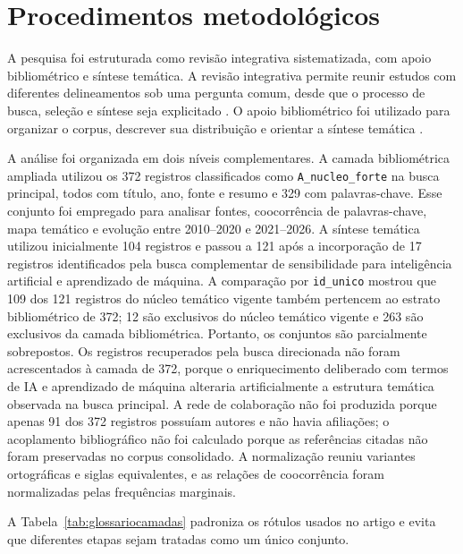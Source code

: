\section{Procedimentos metodológicos}
\label{sec:metodologia}

A pesquisa foi estruturada como revisão integrativa sistematizada, com apoio bibliométrico e síntese temática. A revisão integrativa permite reunir estudos com diferentes delineamentos sob uma pergunta comum, desde que o processo de busca, seleção e síntese seja explicitado \parencite{whittemore_revisaointegrativa_2005,snyder_revisaometodologia_2019}. O apoio bibliométrico foi utilizado para organizar o corpus, descrever sua distribuição e orientar a síntese temática \parencite{donthu_bibliometria_2021}.

A análise foi organizada em dois níveis complementares. A camada bibliométrica ampliada utilizou os 372 registros classificados como \texttt{A\_nucleo\_forte} na busca principal, todos com título, ano, fonte e resumo e 329 com palavras-chave. Esse conjunto foi empregado para analisar fontes, coocorrência de palavras-chave, mapa temático e evolução entre 2010--2020 e 2021--2026. A síntese temática utilizou inicialmente 104 registros e passou a 121 após a incorporação de 17 registros identificados pela busca complementar de sensibilidade para inteligência artificial e aprendizado de máquina. A comparação por \texttt{id\_unico} mostrou que 109 dos 121 registros do núcleo temático vigente também pertencem ao estrato bibliométrico de 372; 12 são exclusivos do núcleo temático vigente e 263 são exclusivos da camada bibliométrica. Portanto, os conjuntos são parcialmente sobrepostos. Os registros recuperados pela busca direcionada não foram acrescentados à camada de 372, porque o enriquecimento deliberado com termos de IA e aprendizado de máquina alteraria artificialmente a estrutura temática observada na busca principal. A rede de colaboração não foi produzida porque apenas 91 dos 372 registros possuíam autores e não havia afiliações; o acoplamento bibliográfico não foi calculado porque as referências citadas não foram preservadas no corpus consolidado. A normalização reuniu variantes ortográficas e siglas equivalentes, e as relações de coocorrência foram normalizadas pelas frequências marginais.

A Tabela~\ref{tab:glossariocamadas} padroniza os rótulos usados no artigo e evita que diferentes etapas sejam tratadas como um único conjunto.

